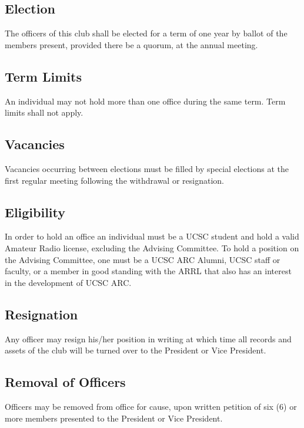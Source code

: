 \documentclass{article}
\begin{document}
\subsection{Election}

The officers of this club shall be elected for a term of one year by ballot of the members    \makeatletter
      \renewcommand\l@subsection{\@dottedtocline{2}{1.5em}{3em}}
    \makeatother
 present, provided there be a quorum, at the annual meeting.

\subsection{Term Limits}

An individual may not hold more than one office during the same term. Term limits shall not apply.  

\subsection{Vacancies}

Vacancies occurring between elections must be filled by special elections at the first regular meeting following the withdrawal or resignation.

\subsection{Eligibility}

In order to hold an office an individual must be a UCSC student and hold a valid Amateur Radio license, excluding the Advising Committee. To hold a position on the Advising Committee, one must be a UCSC ARC Alumni, UCSC staff or faculty, or a member in good standing with the ARRL that also has an interest in the development of UCSC ARC.

\subsection{Resignation}

Any officer may resign his/her position in writing at which time all records and assets of the club will be turned over to the President or Vice President.

\subsection{Removal of Officers}

Officers may be removed from office for cause, upon written petition of six (6) or more members presented to the President or Vice President.\\
\end{document}
